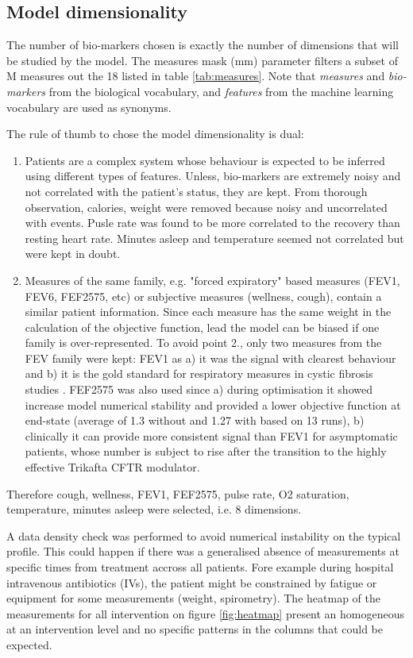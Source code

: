 \subsection{Model dimensionality}
The number of bio-markers chosen is exactly the number of dimensions that will be studied by the model. The measures mask (mm) parameter filters a subset of M measures out the 18 listed in table \ref{tab:measures}. Note that \textit{measures} and \textit{bio-markers} from the biological vocabulary, and \textit{features} from the machine learning vocabulary are used as synonyms.

The rule of thumb to chose the model dimensionality is dual:
\begin{enumerate}
    \item Patients are a complex system whose behaviour is expected to be inferred using different types of features. Unless, bio-markers are extremely noisy and not correlated with the patient's status, they are kept. From thorough observation, calories, weight were removed because noisy and uncorrelated with events. Pusle rate was found to be more correlated to the recovery than resting heart rate. Minutes asleep and temperature seemed not correlated but were kept in doubt.
    \item Measures of the same family, e.g. "forced expiratory" based measures (FEV1, FEV6, FEF2575, etc) or subjective measures (wellness, cough), contain a similar patient information. Since each measure has the same weight in the calculation of the objective function, lead the model can be biased if one family is over-represented. To avoid point 2., only two measures from the FEV family were kept: FEV1 as a) it was the signal with clearest behaviour and b) it is the gold standard for respiratory measures in cystic fibrosis studies \cite{giron_2021}. FEF2575 was also used since a) during optimisation it showed increase model numerical stability and provided a lower objective function at end-state (average of 1.3 without and 1.27 with based on 13 runs), b) clinically it can provide more consistent signal than FEV1 for asymptomatic patients, whose number is subject to rise after the transition to the highly effective Trikafta CFTR modulator.
\end{enumerate}

Therefore cough, wellness, FEV1, FEF2575, pulse rate, O2 saturation, temperature, minutes asleep were selected, i.e. 8 dimensions.

A data density check was performed to avoid numerical instability on the typical profile. This could happen if there was a generalised absence of measurements at specific times from treatment accross all patients. Fore example during hospital intravenous antibiotics (IVs), the patient might be constrained by fatigue or equipment for some measurements (weight, spirometry). The heatmap of the measurements for all intervention on figure \ref{fig:heatmap} present an homogeneous at an intervention level and no specific patterns in the columns that could be expected.

